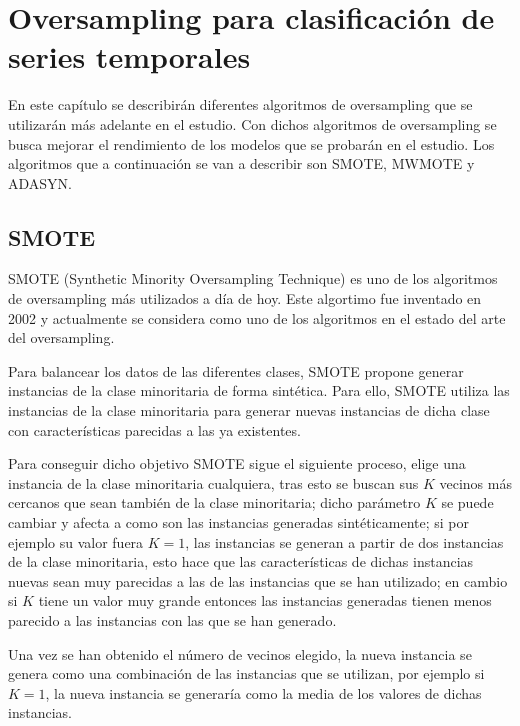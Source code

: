 \chapter{Oversampling para clasificación de series temporales}
En este capítulo se describirán diferentes algoritmos de oversampling que se utilizarán más adelante en el estudio. Con dichos algoritmos de oversampling se busca mejorar el rendimiento de los modelos que se probarán en el estudio. Los algoritmos que a continuación se van a describir son SMOTE, MWMOTE y ADASYN.

\section{SMOTE}
SMOTE (Synthetic Minority Oversampling Technique) es uno de los algoritmos de oversampling más utilizados a día de hoy. Este algortimo fue inventado en 2002 y actualmente se considera como uno de los algoritmos en el estado del arte del oversampling.\newline

Para balancear los datos de las diferentes clases, SMOTE propone generar instancias de la clase minoritaria de forma sintética. Para ello, SMOTE utiliza las instancias de la clase minoritaria para generar nuevas instancias de dicha clase con características parecidas a las ya existentes.\newline

Para conseguir dicho objetivo SMOTE sigue el siguiente proceso, elige una instancia de la clase minoritaria cualquiera, tras esto se buscan sus $K$ vecinos más cercanos que sean también de la clase minoritaria; dicho parámetro $K$ se puede cambiar y afecta a como son las instancias generadas sintéticamente; si por ejemplo su valor fuera $K=1$, las instancias se generan a partir de dos instancias de la clase minoritaria, esto hace que las características de dichas instancias nuevas sean muy parecidas a las de las instancias que se han utilizado; en cambio si $K$ tiene un valor muy grande entonces las instancias generadas tienen menos parecido a las instancias con las que se han generado.\newline

Una vez se han obtenido el número de vecinos elegido, la nueva instancia se genera como una combinación de las instancias que se utilizan, por ejemplo si $K=1$, la nueva instancia se generaría como la media de los valores de dichas instancias.\newline

